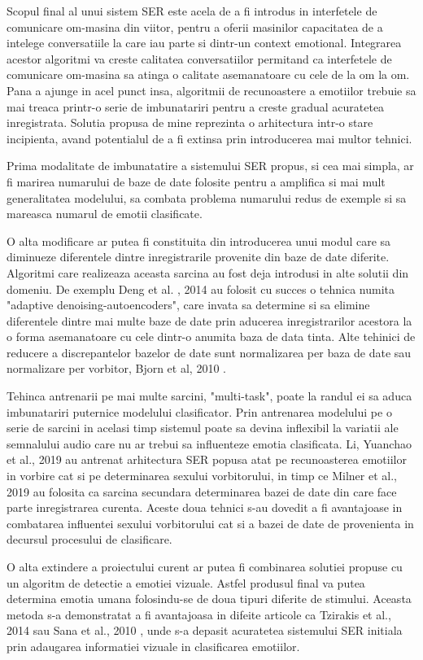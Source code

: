 \documentclass[a4paper,12pt]{book}
\begin{document}
		Scopul final al unui sistem SER este acela de a fi introdus in interfetele de comunicare om-masina din viitor, pentru a oferii masinilor capacitatea de a intelege conversatiile la care iau parte si dintr-un context emotional. Integrarea acestor algoritmi va creste calitatea conversatiilor permitand ca interfetele de comunicare om-masina sa atinga o calitate asemanatoare cu cele de la om la om. Pana a ajunge in acel punct insa, algoritmii de recunoastere a emotiilor trebuie sa mai treaca printr-o serie de imbunatariri pentru a creste gradual acuratetea inregistrata. Solutia propusa de mine reprezinta o arhitectura intr-o stare incipienta, avand potentialul de a fi extinsa prin introducerea mai multor tehnici. \par
		Prima modalitate de imbunatatire a sistemului SER propus, si cea mai simpla, ar fi marirea numarului de baze de date folosite pentru a amplifica si mai mult generalitatea modelului, sa combata problema numarului redus de exemple si sa mareasca numarul de emotii clasificate. \par 
		O alta modificare ar putea fi constituita din introducerea unui modul care sa diminueze diferentele dintre inregistrarile provenite din baze de date diferite. Algoritmi care realizeaza aceasta sarcina au fost deja introdusi in alte solutii din domeniu. De exemplu Deng et al. , 2014 \cite{imbun1} au folosit cu succes o tehnica numita "adaptive denoising-autoencoders", care invata sa determine si sa elimine diferentele dintre mai multe baze de date prin aducerea inregistrarilor acestora la o forma asemanatoare cu cele dintr-o anumita baza de data tinta. Alte tehinici de reducere a discrepantelor bazelor de date sunt normalizarea per baza de date sau normalizare per vorbitor, Bjorn et al, 2010 \cite{spnorm}. \par
		Tehinca antrenarii pe mai multe sarcini, "multi-task", poate la randul ei sa aduca imbunatariri puternice modelului clasificator. Prin antrenarea modelului pe o serie de sarcini in acelasi timp sistemul poate sa devina inflexibil la variatii ale semnalului audio care nu ar trebui sa influenteze emotia clasificata. Li, Yuanchao et al., 2019 \cite{yuan} au antrenat arhitectura SER popusa atat pe recunoasterea emotiilor in vorbire cat si pe determinarea sexului vorbitorului, in timp ce Milner et al., 2019 \cite{multi-domain} au folosita ca sarcina secundara determinarea bazei de date din care face parte inregistrarea curenta. Aceste doua tehnici s-au dovedit a fi avantajoase in combatarea influentei sexului vorbitorului cat si a bazei de date de provenienta in decursul procesului de clasificare.\par 
		O alta extindere a proiectului curent ar putea fi combinarea solutiei propuse cu un algoritm de detectie a emotiei vizuale. Astfel produsul final va putea determina emotia umana folosindu-se de doua tipuri diferite de stimului. Aceasta metoda s-a demonstratat a fi avantajoasa in difeite articole ca Tzirakis et al., 2014 \cite{tzir} sau Sana et al., 2010 \cite{imbun3}, unde s-a depasit acuratetea sistemului SER initiala prin adaugarea informatiei vizuale in clasificarea emotiilor. \par
		
\end{document}
